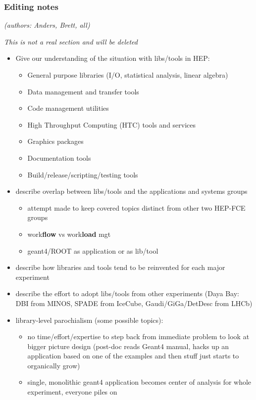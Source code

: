 \subsubsection{Editing notes}

\textit{(authors: Anders, Brett, all)}

\textit{This is not a real section and will be deleted}

\begin{itemize}
\item Give our understanding of the situation with libs/tools in HEP:
  \begin{itemize}
  \item General purpose libraries (I/O, statistical analysis, linear algebra)
  \item Data management and transfer tools
  \item Code management utilities
  \item High Throughput Computing (HTC) tools and services
  \item Graphics packages
  \item Documentation tools
  \item Build/release/scripting/testing tools
  \end{itemize}
\item describe overlap between libs/tools and the applications and systems groups
  \begin{itemize}
  \item attempt made to keep covered topics distinct from other two HEP-FCE groups
  \item work\textbf{flow} vs work\textbf{load} mgt
  \item geant4/ROOT as application or as lib/tool
  \end{itemize}
\item describe how libraries and tools tend to be reinvented for each major experiment 
\item describe the effort to adopt libs/tools from other experiments (Daya Bay: DBI from MINOS, SPADE from IceCube, Gaudi/GiGa/DetDesc from LHCb)
\item library-level parochialism (some possible topics):
  \begin{itemize}
  \item no time/effort/expertise to step back from immediate problem to look at bigger picture design (post-doc reads Geant4 manual, hacks up an application based on one of the examples and then stuff just starts to organically grow)
  \item single, monolithic geant4 application becomes center of analysis for whole experiment, everyone piles on

\end{itemize}
\end{itemize}
